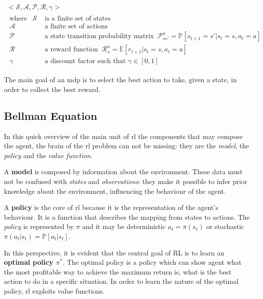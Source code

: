  \begin{equation}\label{eq:mdp}
 \begin{gathered} 
 <\mathcal{S}, \mathcal{A}, \mathcal{P}, \mathcal{R}, \gamma>\\
 \begin{aligned}
 	\text{where}\hspace{10pt} \mathcal{S} & \text{ is a finite set of states} \\
 	\mathcal{A} & \text{ a finite set of actions} \\
 	\mathcal{P} & \text{ a state transition probability matrix}\;\;
 	 \mathcal{P}_{ss'}^a = \mathbb{P}[s_{t+1}= s' | s_t = s, a_t = a]\\
 	\mathcal{R} & \text{ a reward function}
 	 	\;\; \mathcal{R}_{s}^a = \mathbb{E}[r_{t+1} | s_t = s, a_t = a] \\
 	 \gamma & \text{ a discount factor such that } \gamma \in [0,1]
 \end{aligned}
 \end{gathered}
 \end{equation}


The main goal of an \acrshort{mdp} is to select the best action to take, given a state, in order to collect the best reward. 

\subsection{Bellman Equation}

In this quick overview of the main unit of \acrshort{rl} the components that may compose the agent, the brain of the \acrshort{rl} problem can not be missing: they are the \textit{model}, the \textit{policy} and the \textit{value function}.

A \textbf{model} is composed by information about the environment. These data must not be confused with \textit{states} and \textit{observations}: they make it possible to infer prior knowledge about the environment, influencing the behaviour of the agent.

A \textbf{policy} is the core of \acrshort{rl} because it is the representation of the agent's behaviour. It is a function that describes the mapping from states to actions.  The \textit{policy} is represented by $\pi$ and it may be deterministic  $a_t = \pi(s_t)$  or stochastic $\pi(a_t|s_t) = \mathbb{P}[a_t | s_t]$.

In this perspective, it is evident that the central goal of RL is to learn an \textbf{optimal policy $\pi^*$}. The optimal policy is a policy which can show agent what the most profitable way to achieve the maximum return is, what is the best action to do in a specific situation. In order to learn the nature of the optimal policy, \acrshort{rl} exploits value functions.

